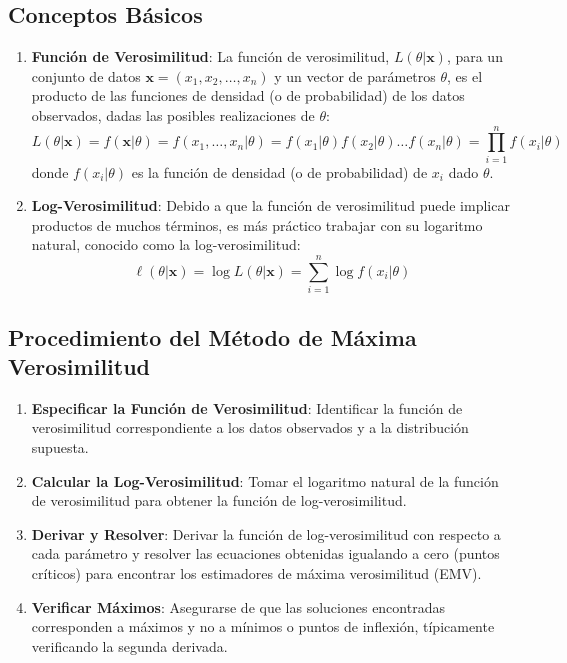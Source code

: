 \documentclass[
  letterpaper,
  DIV=11,
  numbers=noendperiod]{scrreprt}
\begin{document}
\hypertarget{conceptos-buxe1sicos}{%
\subsection{Conceptos Básicos}\label{conceptos-buxe1sicos}}

\begin{enumerate}
\def\labelenumi{\arabic{enumi}.}
\item
  \textbf{Función de Verosimilitud}: La función de verosimilitud,
  \(L(\theta|\mathbf{x})\), para un conjunto de datos
  \(\mathbf{x} = (x_1, x_2, \ldots, x_n)\) y un vector de parámetros
  \(\theta\), es el producto de las funciones de densidad (o de
  probabilidad) de los datos observados, dadas las posibles
  realizaciones de \(\theta\): \[
  L(\theta|\mathbf{x}) = f(\mathbf{x}|\theta)=f(x_1,\ldots,x_n|\theta)=f(x_1|\theta)f(x_2|\theta)\ldots f(x_n|\theta)=\prod_{i=1}^n f(x_i| \theta)
  \] donde \(f(x_i|\theta)\) es la función de densidad (o de
  probabilidad) de \(x_i\) dado \(\theta\).
\item
  \textbf{Log-Verosimilitud}: Debido a que la función de verosimilitud
  puede implicar productos de muchos términos, es más práctico trabajar
  con su logaritmo natural, conocido como la log-verosimilitud: \[
  \ell(\theta|\mathbf{x}) = \log L(\theta|\mathbf{x}) = \sum_{i=1}^n \log f(x_i|\theta)
  \]
\end{enumerate}

\hypertarget{procedimiento-del-muxe9todo-de-muxe1xima-verosimilitud}{%
\subsection{Procedimiento del Método de Máxima
Verosimilitud}\label{procedimiento-del-muxe9todo-de-muxe1xima-verosimilitud}}

\begin{enumerate}
\def\labelenumi{\arabic{enumi}.}
\item
  \textbf{Especificar la Función de Verosimilitud}: Identificar la
  función de verosimilitud correspondiente a los datos observados y a la
  distribución supuesta.
\item
  \textbf{Calcular la Log-Verosimilitud}: Tomar el logaritmo natural de
  la función de verosimilitud para obtener la función de
  log-verosimilitud.
\item
  \textbf{Derivar y Resolver}: Derivar la función de log-verosimilitud
  con respecto a cada parámetro y resolver las ecuaciones obtenidas
  igualando a cero (puntos críticos) para encontrar los estimadores de
  máxima verosimilitud (EMV).
\item
  \textbf{Verificar Máximos}: Asegurarse de que las soluciones
  encontradas corresponden a máximos y no a mínimos o puntos de
  inflexión, típicamente verificando la segunda derivada.
\end{enumerate}
\end{document}
